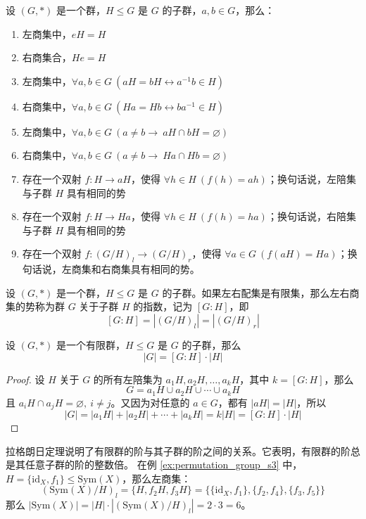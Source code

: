 \begin{proposition}[陪集的性质]
    设 $(G, *)$ 是一个群，$H \le G$ 是 $G$ 的子群，$a, b\in G$，那么：
    \begin{enumerate}
        \item 左商集中，$eH = H$
        \item 右商集合，$He = H$
        \item 左商集中，$\forall a,b\in G\ (aH = bH \leftrightarrow a^{-1}b \in H)$
        \item 右商集中，$\forall a,b\in G\ (Ha = Hb \leftrightarrow ba^{-1} \in H)$
        \item 左商集中，$\forall a,b\in G\ (a\neq b\to\ aH \cap bH = \varnothing)$
        \item 右商集中，$\forall a,b\in G\ (a\neq b\to\ Ha \cap Hb= \varnothing)$
        \item 存在一个双射 $f:H\to aH$，使得 $\forall h\in H\ (f(h) = ah)$；换句话说，左陪集与子群 $H$ 具有相同的势
        \item 存在一个双射 $f:H\to Ha$，使得 $\forall h\in H\ (f(h) = ha)$；换句话说，右陪集与子群 $H$ 具有相同的势
        \item 存在一个双射 $f: (G/H)_l \to (G/H)_r$，使得 $\forall a\in G\ (f(aH) = Ha)$；换句话说，左商集和右商集具有相同的势。
    \end{enumerate}
\end{proposition}

\begin{definition}[指数 Index]
    设 $(G, *)$ 是一个群，$H \le G$ 是 $G$ 的子群。如果左右配集是有限集，那么左右商集的势称为群 $G$ 关于子群 $H$ 的指数，记为 $[G:H]$，即
    \[
        [G:H] = |(G/H)_l| = |(G/H)_r|
    \]
\end{definition}

\begin{theorem}
    设 $(G, *)$ 是一个有限群，$H \le G$ 是 $G$ 的子群，那么
    \[
        |G| = [G:H] \cdot |H|
    \]
    \label{thm:group_lagrange_theorem}
\end{theorem}
\begin{proof}
    设 $H$ 关于 $G$ 的所有左陪集为 $a_1H, a_2H, \ldots, a_kH$，其中 $k = [G:H]$，那么
    \[
        G = a_1H \cup a_2H \cup \cdots \cup a_kH
    \]
    且 $a_iH \cap a_jH = \varnothing,\ i\neq j$。又因为对任意的 $a\in G$，都有 $|aH| = |H|$，所以
    \[
        |G| = |a_1H| + |a_2H| + \cdots + |a_kH| = k|H| = [G:H] \cdot |H|
    \]
\end{proof}
\begin{note}
    拉格朗日定理说明了有限群的阶与其子群的阶之间的关系。它表明，有限群的阶总是其任意子群的阶的整数倍。
    在例 \ref{ex:permutation_group_s3} 中，$H=\{\mathrm{id}_X, f_1\} \leq \mathrm{Sym}(X)$，那么左商集：
    \[
        (\mathrm{Sym}(X)/H)_l = \{H, f_2H, f_3H\} = \{\{\mathrm{id}_X, f_1\}, \{f_2, f_4\}, \{f_3, f_5\}\}
    \]
    那么 $|\mathrm{Sym}(X)| = |H| \cdot |(\mathrm{Sym}(X)/H)_l| = 2 \cdot 3 = 6$。
\end{note}

